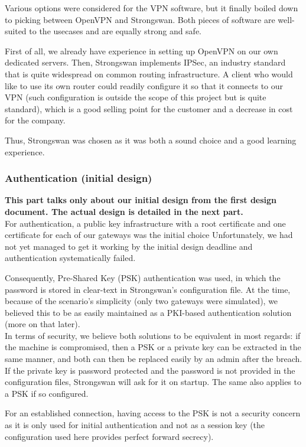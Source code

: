 \documentclass[paper=a4, fontsize=11pt]{scrartcl}
\begin{document}
Various options were considered for the VPN software, but it finally boiled down
to picking between OpenVPN and Strongswan.
Both pieces of software are well-suited to the usecases and are equally
strong and safe.

First of all, we already have experience in setting up OpenVPN on our own
dedicated servers.
Then, Strongswan implements IPSec, an industry standard that is quite widespread
on common routing infrastructure.
A client who would like to use its own router could readily configure
it so that it connects to our VPN (such configuration is outside the
scope of this project but is quite standard), which is a good selling point for
the customer and a decrease in cost for the company.

Thus, Strongswan was chosen as it was both a sound choice and a good learning
experience.

\subsubsection{Authentication (initial design)}
\textbf{%
\huge \danger{} \normalsize
This part talks only about our initial design from the first design document.
The actual design is detailed in the next part.
}
\\

For authentication, a public key infrastructure with a root certificate and one
certificate for each of our gateways was the initial choice
Unfortunately, we had not yet managed to get it working by the initial design
deadline and authentication systematically failed.

Consequently, Pre-Shared Key (PSK) authentication was used, in which the
password is stored in clear-text in Strongswan's configuration file.
At the time, because of the scenario's simplicity (only two gateways were
simulated), we believed this to be as easily maintained as a
PKI-based authentication solution (more on that later).\\

In terms of security, we believe both solutions to be equivalent in most
regards: if the machine is compromised, then a PSK or a private key can be
extracted in the same manner, and both can then be replaced easily by an admin
after the breach. 
If the private key is password protected and the password is not provided in the
configuration files, Strongswan will ask for it on startup.
The same also applies to a PSK if so configured.

For an established connection, having access to the PSK is not a security
concern as it is only used for initial authentication and not as a session key
(the configuration used here provides perfect forward secrecy).\\
\end{document}

